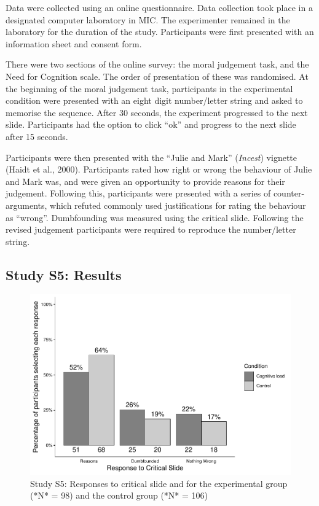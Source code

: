 \documentclass[
  american,
  man,floatsintext]{apa7}
\begin{document}
Data were collected using an online questionnaire. Data collection took place in a designated computer laboratory in MIC. The experimenter remained in the laboratory for the duration of the study. Participants were first presented with an information sheet and consent form.

There were two sections of the online survey: the moral judgement task, and the Need for Cognition scale. The order of presentation of these was randomised. At the beginning of the moral judgement task, participants in the experimental condition were presented with an eight digit number/letter string and asked to memorise the sequence. After 30 seconds, the experiment progressed to the next slide. Participants had the option to click \enquote{ok} and progress to the next slide after 15 seconds.

Participants were then presented with the \enquote{Julie and Mark} (\emph{Incest}) vignette (Haidt et al., 2000). Participants rated how right or wrong the behaviour of Julie and Mark was, and were given an opportunity to provide reasons for their judgement. Following this, participants were presented with a series of counter-arguments, which refuted commonly used justifications for rating the behaviour as \enquote{wrong}. Dumbfounding was measured using the critical slide. Following the revised judgement participants were required to reproduce the number/letter string.

\hypertarget{study-s5-results}{%
\subsection{Study S5: Results}\label{study-s5-results}}

\begin{figure}[!h]
\includegraphics{Supplementary_files/figure-latex/ch5S5fig2criticalcondition-1} \caption{Study S5: Responses to critical slide and for the experimental group (*N* = 98) and the control group (*N* = 106)}\label{fig:ch5S5fig2criticalcondition}
\end{figure}
\end{document}
